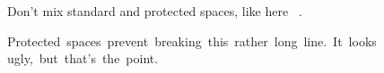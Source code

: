 Don't mix standard and protected spaces, like here ~\cite{smith14}.

Protected~spaces~prevent~breaking~this~rather~long~line.~It~looks~
ugly,~but~that's~the~point.
